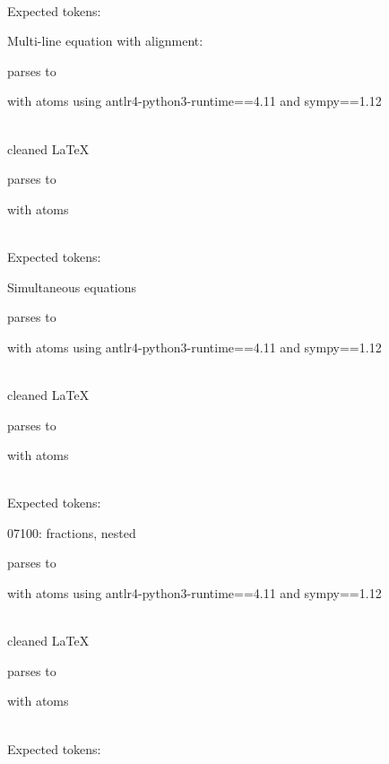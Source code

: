 \documentclass{article}
\begin{document}
\ \\
Expected tokens:



\hrulefill

Multi-line equation with alignment:

parses to

with atoms
using antlr4-python3-runtime==4.11 and sympy==1.12

\ \\
cleaned \LaTeX

parses to

with atoms


\ \\
Expected tokens:



\hrulefill

Simultaneous equations

parses to

with atoms
using antlr4-python3-runtime==4.11 and sympy==1.12

\ \\
cleaned \LaTeX

parses to

with atoms


\ \\
Expected tokens:



\hrulefill

07100:
fractions, nested

parses to

with atoms
using antlr4-python3-runtime==4.11 and sympy==1.12

\ \\
cleaned \LaTeX

parses to

with atoms


\ \\
Expected tokens:

\end{document}
